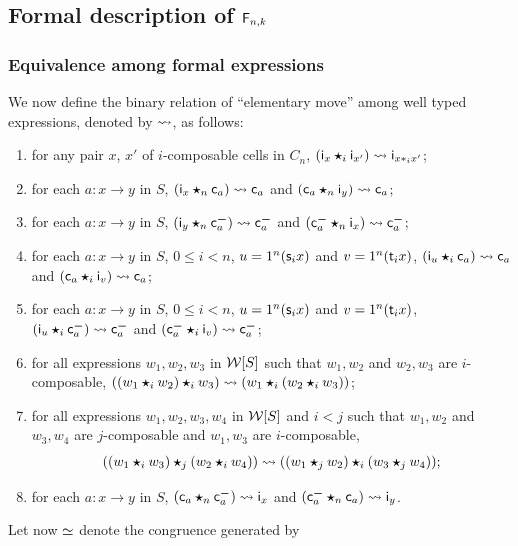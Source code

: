   
\subsection{Formal description of \texorpdfstring{$\mathsf{F}_{n,k}$}{F(n,k)}}
\label{subsec:congruence}

  
 \subsubsection{Equivalence among formal expressions}\label{ssubsec:eqform}
 We now define the binary relation of ``elementary move'' among well
 typed expressions, denoted by $\leadsto$, as follows:
\begin{enumerate}[label=\textbf{(e\arabic*)}]
\item\label{ei} for any pair $x$, $x'$ of $i$-composable cells in $C_n$,
  $(\mathsf{i}_{x}\bm{\star}_{i}\mathsf{i}_{x'})\leadsto\mathsf{i}_{x\ast_{i} x'} $;
\item\label{eii} for each $a:x\to y$ in $S$, $(\mathsf{i}_{x}\bm{\star}_{n}\mathsf{c}_{a})\leadsto
  \mathsf{c}_{a}$ and $(\mathsf{c}_{a}\bm{\star}_{n} \mathsf{i}_{y})\leadsto \mathsf{c}_{a}$;
 \item\label{eiii} for each $a:x\to y$ in $S$, $(\mathsf{i}_{y}\bm{\star}_{n}\mathsf{c}^{\boldsymbol{-}}_{a})\leadsto
   \mathsf{c}^{\boldsymbol{-}}_{a}$ and $(\mathsf{c}^{\boldsymbol{-}}_{a}\bm{\star}_{n} \mathsf{i}_{x})\leadsto \mathsf{c}^{\boldsymbol{-}}_{a}$;
\item\label{eiv} for each $a:x\to y$ in $S$, $0\leq i< n$, $u=1^{n}(\mathsf{s}_{i}
  x)$ and $v=1^{n}(\mathsf{t}_{i} x)$, $(\mathsf{i}_{u}\bm{\star}_{i}\mathsf{c}_{a})\leadsto
  \mathsf{c}_{a}$ and $(\mathsf{c}_{a}\bm{\star}_{i} \mathsf{i}_{v})\leadsto \mathsf{c}_{a}$;
\item\label{ev} for each $a:x\to y$ in $S$, $0\leq i< n$, $u=1^{n}(\mathsf{s}_{i}
  x)$ and $v=1^{n}(\mathsf{t}_{i} x)$, $(\mathsf{i}_{u}\bm{\star}_{i}\mathsf{c}^{\boldsymbol{-}}_{a})\leadsto
  \mathsf{c}^{\boldsymbol{-}}_{a}$ and $(\mathsf{c}^{\boldsymbol{-}}_{a}\bm{\star}_{i} \mathsf{i}_{v})\leadsto \mathsf{c}^{\boldsymbol{-}}_{a}$;  
 \item\label{evi} for all expressions $w_1,w_2,w_3$ in $\mathcal{W}[S]$ such that $w_1,w_2$ and
   $w_2,w_3$ are $i$-composable, $((w_1\bm{\star}_{i} w_2)\bm{\star}_{i} w_3)\leadsto
   (w_1\bm{\star}_{i}(w_2\bm{\star}_{i} w_3))$;
 \item\label{evii} for all expressions $w_1,w_2,w_3,w_4$ in $\mathcal{W}[S]$ and $i<j$
   such that $w_1,w_2$ and $w_3,w_4$ are
   $j$-composable and $w_1,w_3$ are $i$-composable,
   \[
     ((w_1\bm{\star}_{i} w_3)\bm{\star}_{j} (w_2\bm{\star}_{i} w_4))\leadsto ((w_1\bm{\star}_{j}
     w_2)\bm{\star}_{i} (w_3\bm{\star}_{j} w_4));
   \]
  \item\label{eviii} for each $a:x\to y$ in $S$, $(\mathsf{c}_{a}\bm{\star}_{n}\mathsf{c}^{\boldsymbol{-}}_{a})\leadsto
    \mathsf{i}_{x}$ and $(\mathsf{c}^{\boldsymbol{-}}_{a}\bm{\star}_{n}\mathsf{c}_{a})\leadsto \mathsf{i}_{y}$. 
  \end{enumerate}
  Let now $\simeq$ denote the congruence generated by
